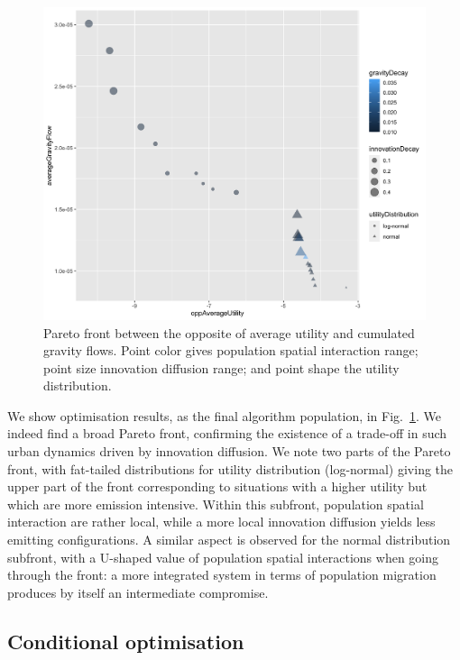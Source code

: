\documentclass{article}
\begin{document}
\begin{figure}
	\centering
	\includegraphics[width=\linewidth]{pareto-oppAverageUtility-averageGravityFlow_color-gravityDecay_size-innovationDecay_shape-utilityDistribution.png}
	\caption{Pareto front between the opposite of average utility and cumulated gravity flows. Point color gives population spatial interaction range; point size innovation diffusion range; and point shape the utility distribution.\label{fig:fig1}}
\end{figure}

We show optimisation results, as the final algorithm population, in Fig.~\ref{fig:fig1}. We indeed find a broad Pareto front, confirming the existence of a trade-off in such urban dynamics driven by innovation diffusion. We note two parts of the Pareto front, with fat-tailed distributions for utility distribution (log-normal) giving the upper part of the front corresponding to situations with a higher utility but which are more emission intensive. Within this subfront, population spatial interaction are rather local, while a more local innovation diffusion yields less emitting configurations. A similar aspect is observed for the normal distribution subfront, with a U-shaped value of population spatial interactions when going through the front: a more integrated system in terms of population migration produces by itself an intermediate compromise.






\subsection{Conditional optimisation}
\end{document}
